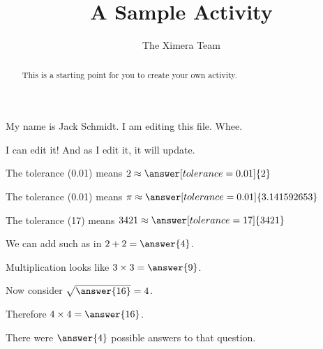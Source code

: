 \documentclass{ximera}
\title{A Sample Activity}
\author{The Ximera Team}
\begin{document}
\begin{abstract}
This is a starting point for you to create your own activity.
\end{abstract}

\maketitle

My name is Jack Schmidt.  I am editing this file.  Whee.

I can edit it!  And as I edit it, it will update.

\begin{problem}
   The tolerance (0.01) means $2 \approx \answer[tolerance=0.01]{2}$
\end{problem}

 \begin{problem}
   The tolerance (0.01) means $\pi \approx \answer[tolerance=0.01]{3.141592653}$
 \end{problem}

 \begin{problem}
   The tolerance (17) means $3421 \approx \answer[tolerance=17]{3421}$
 \end{problem}


 \begin{problem}
   We can add such as in $2 + 2 = \answer{4}$.
   \begin{problem}
     Multiplication looks like $3 \times 3 = \answer{9}$.
     \begin{problem}
       Now consider $\sqrt{\answer{16}} = 4$.
       \begin{problem}
         Therefore $4 \times 4 = \answer{16}$.
       \end{problem}
     \end{problem}
   \end{problem}
   \end{problem}

\begin{problem}
  \begin{multipleChoice}
   \end{multipleChoice}

   \begin{problem}
     There were $\answer{4}$ possible answers to that question.

     \begin{problem}
       \begin{multipleChoice}
       \end{multipleChoice}
     \end{problem}
   \end{problem}
\end{problem}
\end{document}
